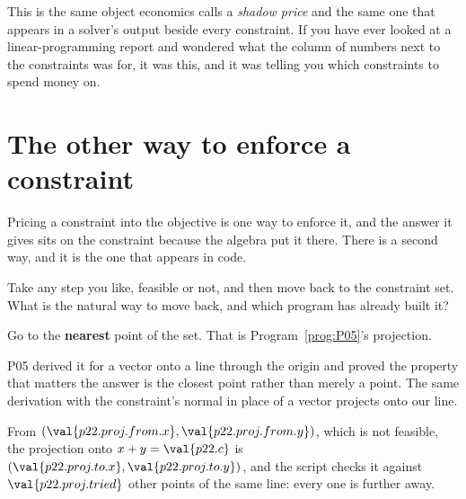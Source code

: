 \begin{fr}
\begin{note}
This is the same object economics calls a \emph{shadow price} and the same one
that appears in a solver's output beside every constraint. If you have ever
looked at a linear-programming report and wondered what the column of numbers
next to the constraints was for, it was this, and it was telling you which
constraints to spend money on.
\end{note}
\end{fr}

\section{The other way to enforce a constraint}
\label{sec:P22-projection}

\begin{fr}
Pricing a constraint into the objective is one way to enforce it, and the
answer it gives sits on the constraint because the algebra put it there. There
is a second way, and it is the one that appears in code.

Take any step you like, feasible or not, and then move back to the constraint
set. What is the natural way to move back, and which program has already built
it?
\dotline
\nextframe
\end{fr}

\begin{fr}
\begin{ansblock}
Go to the \textbf{nearest} point of the set. That is
Program~\ref{prog:P05}'s projection.
\end{ansblock}

P05 derived it for a vector onto a line through the origin and proved the
property that matters \dash{} the answer is the closest point rather than
merely a point. The same derivation with the constraint's normal in place of a
vector projects onto our line.

From $(\val{p22.proj.from.x}, \val{p22.proj.from.y})$, which is not feasible,
the projection onto $x + y = \val{p22.c}$ is
$(\val{p22.proj.to.x}, \val{p22.proj.to.y})$, and the script checks it against
$\val{p22.proj.tried}$ other points of the same line: every one is further
away.

\end{fr}

